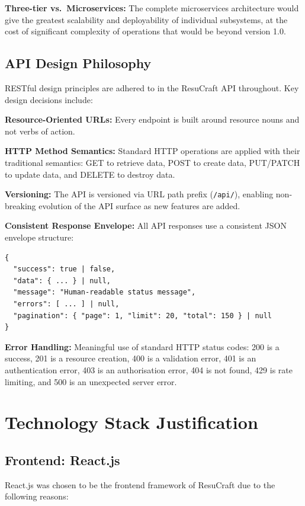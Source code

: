 \documentclass[12pt, a4paper, oneside]{report}
\begin{document}
\textbf{Three-tier vs.\ Microservices:} The complete microservices architecture would give the greatest scalability and deployability of individual subsystems, at the cost of significant complexity of operations that would be beyond version 1.0.

\subsection{API Design Philosophy}

RESTful design principles are adhered to in the ResuCraft API\cite{restapi2011} throughout. Key design decisions include:

\textbf{Resource-Oriented URLs:} Every endpoint is built around resource nouns and not verbs of action.

\textbf{HTTP Method Semantics:} Standard HTTP operations are applied with their traditional semantics: GET to retrieve data, POST to create data, PUT/PATCH to update data, and DELETE to destroy data.

\textbf{Versioning:} The API is versioned via URL path prefix (\texttt{/api/}), enabling non-breaking evolution of the API surface as new features are added.

\textbf{Consistent Response Envelope:} All API responses use a consistent JSON envelope structure:
\begin{verbatim}
{
  "success": true | false,
  "data": { ... } | null,
  "message": "Human-readable status message",
  "errors": [ ... ] | null,
  "pagination": { "page": 1, "limit": 20, "total": 150 } | null
}
\end{verbatim}

\textbf{Error Handling:} Meaningful use of standard HTTP status codes: 200 is a success, 201 is a resource creation, 400 is a validation error, 401 is an authentication error, 403 is an authorisation error, 404 is not found, 429 is rate limiting, and 500 is an unexpected server error\cite{owasp2021}.

\section{Technology Stack Justification}

\subsection{Frontend: React.js}

React.js \cite{react2024} was chosen to be the frontend framework of ResuCraft due to the following reasons:
\end{document}
